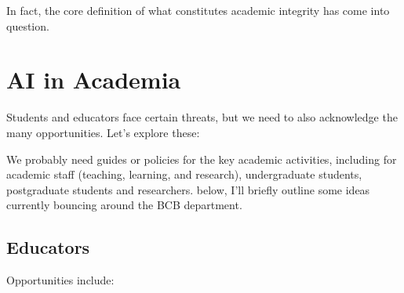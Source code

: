 \documentclass[
  10t,
]{article}
\begin{document}
In fact, the core definition of what constitutes academic integrity has
come into question.

\section{AI in Academia}\label{ai-in-academia}

Students and educators face certain threats, but we need to also
acknowledge the many opportunities. Let's explore these:

We probably need guides or policies for the key academic activities,
including for academic staff (teaching, learning, and research),
undergraduate students, postgraduate students and researchers. below,
I'll briefly outline some ideas currently bouncing around the BCB
department.

\subsection{Educators}\label{educators}

Opportunities include:
\end{document}
